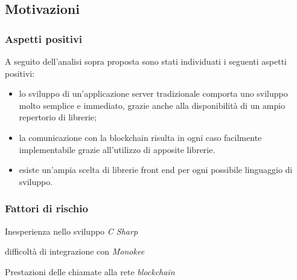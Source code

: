 \subsection{Motivazioni}
\subsubsection{Aspetti positivi}
A seguito dell’analisi sopra proposta sono stati individuati i seguenti aspetti positivi:
\begin{itemize}
    \item lo sviluppo di un’applicazione server tradizionale comporta uno sviluppo molto semplice e immediato, grazie anche alla disponibilità di un ampio repertorio di librerie;
    \item la comunicazione con la blockchain risulta in ogni caso facilmente implementabile grazie all’utilizzo di apposite librerie.
    \item esiste un’ampia scelta di librerie front end per ogni possibile linguaggio di sviluppo.
\end{itemize}
    
\subsubsection{Fattori di rischio}
\begin{risk}{Inesperienza nello sviluppo \emph{C Sharp}}
    \label{risk:centralization-vision-from-user} 
\end{risk}
\begin{risk}{difficoltà di integrazione con \emph{Monokee}}
    \label{risk:centralization-vision-from-user} 
\end{risk}
\begin{risk}{Prestazioni delle chiamate alla rete \emph{blockchain}}
    \label{risk:centralization-vision-from-user} 
\end{risk}
